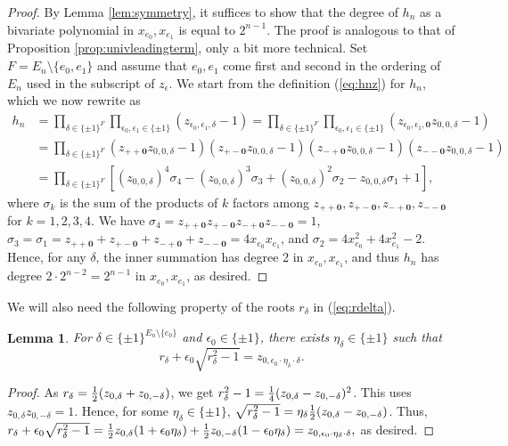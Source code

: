\documentclass[a4paper, 11pt, twoside]{article}
\newcommand{\azero}{\mathbf{0}}
\theoremstyle{plain}
\newtheorem{lemma}[theorem]{Lemma}
\begin{document}
\begin{proof}
By Lemma \ref{lem:symmetry}, it suffices to show that the   degree of $h_n$ as a bivariate polynomial in $x_{e_0}, x_{e_1}$ is equal to $2^{n-1}$.
The proof is analogous to that of Proposition \ref{prop:univleadingterm}, only a bit more technical.
Set $F=E_n\setminus \{e_0,e_1\}$ and assume that $e_0,e_1$ come first and second in the ordering of $E_n$ used in the subscript of $z_\epsilon$.
We start from the definition (\ref{eq:hnz})  for $h_n$, which we now rewrite as 
\begin{align*}
h_n & = \prod_{\delta \in \{\pm 1\}^F} \prod_{\epsilon_0,\epsilon_1\in\{\pm 1\}} 
(z_{\epsilon_0,\epsilon_1,\delta}-1) 
= \prod_{\delta \in \{\pm 1\}^F} \prod_{\epsilon_0,\epsilon_1\in\{\pm 1\}}
(z_{\epsilon_0,\epsilon_1,\azero}z_{0,0,\delta}-1)\\
&= \prod_{\delta \in \{\pm 1\}^F} 
(z_{++\azero}z_{0,0,\delta}-1)(z_{+-\azero}z_{0,0,\delta}-1)(z_{-+\azero}z_{0,0,\delta}-1)(z_{--\azero}z_{0,0,\delta}-1)\\
&= \prod_{\delta \in \{\pm 1\}^F} 
[(z_{0,0,\delta})^4 \sigma_4-(z_{0,0,\delta})^3\sigma_3+(z_{0,0,\delta})^2\sigma_2 -z_{0,0,\delta}\sigma_1+1],
\end{align*}
  where $\sigma_k$ is the sum of the products of $k$ factors among $z_{++\azero}, z_{+-\azero}, z_{-+\azero}, z_{--\azero}$ for $k=1,2,3,4$. We have 
  $\sigma_4=z_{++\azero} z_{+-\azero} z_{-+\azero} z_{--\azero}=1$, $\sigma_3=\sigma_1=z_{++\azero}+ z_{+-\azero}+ z_{-+\azero}+ z_{--\azero}= 4x_{e_0}x_{e_1}$, and $\sigma_2= 4x_{e_0}^2+4x_{e_1}^2-2$.
  Hence, for any $\delta$, the inner summation has   degree 2 in $x_{e_0},x_{e_1}$, and thus $h_n$ has   degree $2\cdot 2^{n-2}=2^{n-1}$ in $x_{e_0},x_{e_1}$, as desired.
\end{proof}

We will also need the following property of the roots $r_\delta$ in (\ref{eq:rdelta}).

\begin{lemma}
\label{lem:z}
For $\delta\in\{\pm 1\}^{E_n\setminus \{e_0\}}$ and $\epsilon_0\in \{\pm 1\}$, there exists $\eta_{\delta}\in\{\pm 1\}$ such that 
\[
r_\delta +\epsilon_0\sqrt{r_\delta^2 -1}= z_{0,\epsilon_0\cdot \eta_\delta \cdot  \delta}.
\]
\end{lemma}
\begin{proof}
As $r_\delta={1\over 2}(z_{0,\delta}+z_{0,-\delta})$, we get $r_\delta^2 -1= {1\over 4}(z_{0,\delta}-z_{0,-\delta})^2$. This uses $z_{0,\delta}z_{0,-\delta} = 1$. Hence, for some  $\eta_\delta\in\{\pm 1\}$, 
 $\sqrt{r_\delta^2-1}=\eta_\delta {1\over 2}(z_{0,\delta}-z_{0,-\delta})$. Thus,
$r_\delta +\epsilon_0\sqrt{r_\delta^2-1}
= {1\over 2} z_{0,\delta}(1+\epsilon_0\eta_\delta) +{1\over 2}z_{0,-\delta}(1-\epsilon_0\eta_\delta)
= z_{0,\epsilon_0\cdot \eta_\delta \cdot \delta},$
as desired.
\end{proof}
\end{document}
